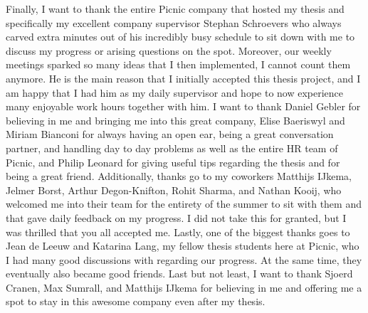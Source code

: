Finally, I want to thank the entire Picnic company that hosted my thesis and
specifically my excellent company supervisor Stephan Schroevers who always carved extra minutes
out of his incredibly busy schedule to sit down with me to discuss my progress
or arising questions on the spot. Moreover, our weekly meetings sparked so many
ideas that I then implemented, I cannot count them anymore. He is the main
reason that I initially accepted this thesis project, and I am happy that I had
him as my daily supervisor and hope to now experience many enjoyable work hours
together with him. I want to thank Daniel Gebler for believing in me and
bringing me into this great company, Elise Baeriswyl and Miriam Bianconi
for always having an open ear, being a great conversation partner,
and handling day to day problems as well as the entire HR team of Picnic,
and Philip Leonard for giving useful tips regarding the thesis and for being
a great friend.
Additionally, thanks go to my coworkers Matthijs IJkema, Jelmer Borst,
Arthur Degon-Knifton, Rohit Sharma, and Nathan Kooij, who welcomed me into their
team for the entirety of the summer to sit with them and that gave daily
feedback on my progress. I did not take this for granted, but I was thrilled
that you all accepted me.
Lastly, one of the biggest thanks goes to Jean de Leeuw and Katarina Lang,
my fellow thesis students here at Picnic, who I had many good discussions with
regarding our progress. At the same time, they eventually also became good
friends.
Last but not least, I want to thank Sjoerd Cranen, Max Sumrall,
and Matthijs IJkema for believing in me and offering me a spot to stay in this
awesome company even after my thesis.

\vfill

\cleardoublepage

\raggedbottom
